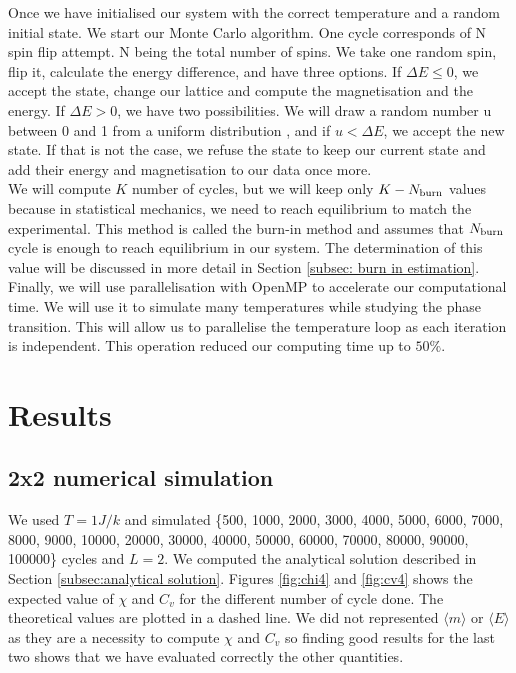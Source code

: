 \documentclass[english,notitlepage,reprint,nofootinbib]{revtex4-2}  %
\begin{document}
	Once we have initialised our system with the correct temperature and a random initial
	state. We start our Monte Carlo algorithm. One cycle corresponds of N spin flip attempt.
	N being the total number of spins. We take one random spin, flip it, calculate the
	energy difference, and have three options. If $\Delta E \le 0 $, we accept the state,
	change our lattice and compute the magnetisation and the energy. If $\Delta E > 0$, we have
	two possibilities. We will draw a random number u between 0 and 1 from a uniform distribution
	, and if $u < \Delta E$, we accept the new state. If that is not the case, we refuse the state to keep our current state and add their energy and magnetisation to our data once more. \\

	We will compute $K$ number of cycles, but we will keep only $K - N_{\rm burn}$ values
	because in statistical mechanics, we need to reach equilibrium to match the experimental.
	This method is called the burn-in method and assumes that $N_{\rm burn}$ cycle
	is enough to reach equilibrium in our system. The determination of this value will be
	discussed in more detail in Section \ref{subsec: burn in estimation}. \\

	Finally, we will use parallelisation with OpenMP to accelerate our computational time. We
	will use it to simulate many temperatures while studying the
	phase transition. This will allow us to parallelise the temperature loop as each iteration
	is independent. This operation reduced our computing time up to $50\%$.

	\section{Results}\label{sec:results}
	\subsection{2x2 numerical simulation}\label{subsec: 2x2 numerical}
	We used $T=1 J/k$ and simulated \{500, 1000, 2000, 3000, 4000, 5000, 6000,
	7000, 8000, 9000, 10000, 20000, 30000, 40000, 50000, 60000, 70000, 80000, 90000, 100000\}
	cycles and $L=2$. We computed the analytical solution described in Section \ref{subsec:analytical solution}.
	Figures \ref{fig:chi4} and \ref{fig:cv4} shows the expected value of $\chi$ and $C_v$ for the different number of cycle done. The theoretical values are plotted in a dashed line. We did
	not represented $\langle m \rangle$ or $\langle E \rangle$ as they are a necessity to compute $\chi$ and $C_v$ so
	finding good results for the last two shows that we have evaluated correctly the other
	quantities.
\end{document}
